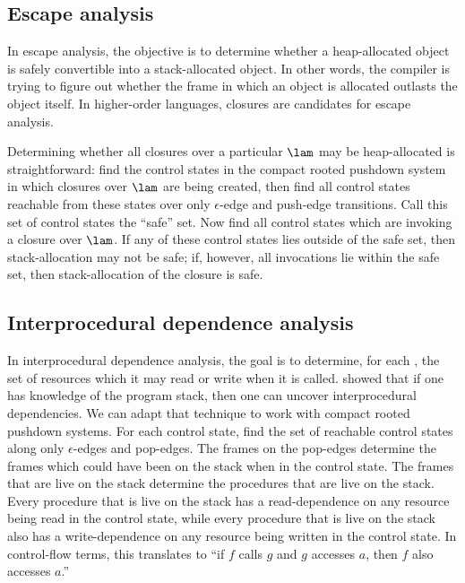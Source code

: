 \subsection{Escape analysis}
In escape analysis, the objective is to determine whether a
heap-allocated object is safely convertible into a stack-allocated
object.
In other words, the compiler is trying to figure out whether the frame
in which an object is allocated outlasts the object itself.
In higher-order languages, closures are candidates for escape
analysis.

Determining whether all closures over a particular \lamterm{} $\lam$
may be heap-allocated is straightforward: find the control states in
the compact rooted pushdown system in which closures over $\lam$ are being created,
then find all control states reachable from these states
over only $\epsilon$-edge and push-edge transitions.
Call this set of control states the ``safe'' set.
Now find all control states which are invoking a closure over $\lam$.
If any of these control states lies outside of the safe set, then
stack-allocation may not be safe; if, however, all invocations lie
within the safe set, then stack-allocation of the closure is safe.




\subsection{Interprocedural dependence analysis}
In interprocedural dependence analysis, the goal is to determine, for
each \lamterm{}, the set of resources which it may read or write when
it is called.
\citet{mattmight:Might:2009:Dependence} showed that if one has knowledge of the program
stack, then one can uncover interprocedural
dependencies.
We can adapt that technique to work with compact rooted pushdown systems.
For each control state, find the set of reachable control states along
only $\epsilon$-edges and pop-edges.
The frames on the pop-edges determine the frames which could have been
on the stack when in the control state.
The frames that are live on the stack determine the procedures that are live on the stack.
Every procedure that is live on the stack has a read-dependence on any
resource being read in the control state, while every procedure that is live
on the stack also has a write-dependence on any resource being written in
the control state.
In control-flow terms, this translates to ``if $f$ calls $g$ and $g$
accesses $a$, then $f$ also accesses $a$.''




